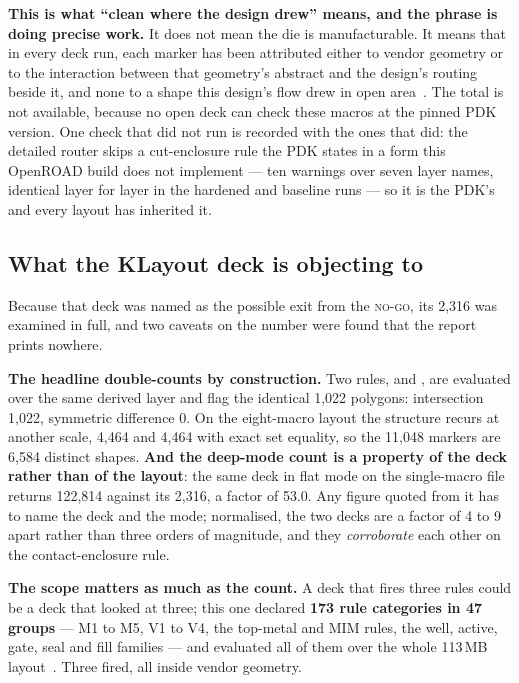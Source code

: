 \textbf{This is what ``clean where the design drew'' means, and the
phrase is doing precise work.} It does not mean the die is
manufacturable. It means that in every deck run, each marker has been
attributed either to vendor geometry or to the interaction between that
geometry's abstract and the design's routing beside it, and none to a
shape this design's flow drew in open area~\cite{companion_decks}. The
total is not available, because no open deck can check these macros at
the pinned PDK version.
One check that did not run is recorded with the ones that did: the
detailed router skips a cut-enclosure rule the PDK states in a form this
OpenROAD build does not implement --- ten warnings over seven layer
names, identical layer for layer in the hardened and baseline runs --- so
it is the PDK's and every layout has inherited it.

\subsection{What the KLayout deck is objecting to}

Because that deck was named as the possible exit from the
\textsc{no-go}, its 2,316 was examined in full, and two caveats on the
number were found that the report prints nowhere.

\textbf{The headline double-counts by construction.} Two rules,
 and , are evaluated over the same derived
layer and flag the identical 1,022 polygons: intersection 1,022,
symmetric difference 0. On the eight-macro layout the structure recurs
at another scale, 4,464 and 4,464 with exact set equality, so the 11,048
markers are 6,584 distinct shapes. \textbf{And the deep-mode count is a
property of the deck rather than of the layout}: the same deck in flat
mode on the single-macro file returns 122,814 against its 2,316, a
factor of 53.0. Any figure
quoted from it has to name the deck and the mode; normalised, the two
decks are a factor of 4 to 9 apart rather than three orders of
magnitude, and they \emph{corroborate} each other on the
contact-enclosure rule.

\textbf{The scope matters as much as the count.} A deck that fires three
rules could be a deck that looked at three; this one declared
\textbf{173 rule categories in 47 groups} --- M1 to M5, V1 to V4, the
top-metal and MIM rules, the well, active, gate, seal and fill families
--- and evaluated all of them over the whole 113\,MB
layout~\cite{krinke2024}. Three fired, all inside vendor geometry.

